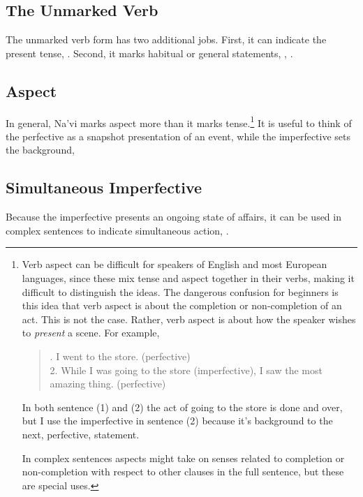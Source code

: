 \subsection{The Unmarked Verb} The unmarked verb form has two
additional jobs.  First, it can indicate the present tense,
 .  Second, it marks
habitual or general statements, 
,  .

\subsection{Aspect} In general, Na'vi marks aspect more than it marks
tense.\footnote{Verb aspect can be difficult for speakers of English
and most European languages, since these mix tense and aspect
together in their verbs, making it difficult to distinguish the
ideas.  The dangerous confusion for beginners is this idea that verb
aspect is about the completion or non-completion of an act.  This is
not the case.  Rather, verb aspect is about how the speaker wishes to
\textit{present} a scene.  For example,

\begin{quotation}
.  I went to the store.  (perfective)\\
2.  While I was going to the store (imperfective), I saw the most amazing thing. (perfective)
\end{quotation}
In both sentence (1) and (2) the act of going to the store is done
and over, but I use the imperfective in sentence (2) because
it's background to the next, perfective, statement.

In complex sentences aspects might take on senses related to
completion or non-completion with respect to other clauses in the full
sentence, but these are special uses.}  It is useful to think of the
perfective as a snapshot presentation of an event, while the
imperfective sets the background,  

\subsection{Simultaneous Imperfective} Because the imperfective
presents an ongoing state of affairs, it can be used in complex
sentences to indicate simultaneous action,  .

